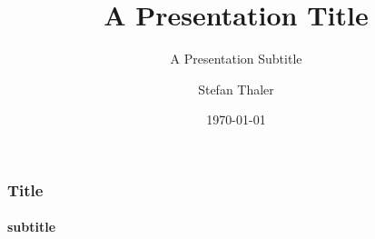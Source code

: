 \documentclass{beamer}
\title{A Presentation Title}
\subtitle{A Presentation Subtitle}
\author[sthaler]{Stefan Thaler} %
\date{\today}
\begin{document}
%
%
\begin{frame}[title-01]
\end{frame}

\begin{frame}[title-02]
\end{frame}

\begin{frame}[title-03]
\end{frame}

%
%
\begin{frame}[content-a1]
 \frametitle{Title}
 \framesubtitle{subtitle}
\end{frame}

\begin{frame}[content-a2]
\end{frame}

%
%
\begin{frame}[content-b1]
\end{frame}

\begin{frame}[content-b2]
\end{frame}

\begin{frame}[content-b3]
\end{frame}

%
%
\begin{frame}[content-c1]
\end{frame}

\begin{frame}[content-c2]
\end{frame}

\begin{frame}[content-c3]
\end{frame}

\begin{frame}[content-c4]
\end{frame}
\end{document}
